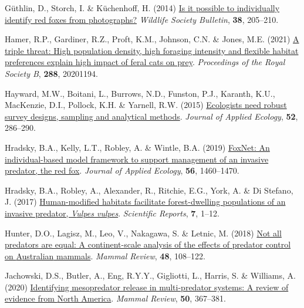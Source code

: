 \documentclass[preprint, 3p, authoryear]{elsarticle} %
\newlength{\cslhangindent}
\newlength{\cslentryspacingunit} %
\newenvironment{CSLReferences}[2] %
 {%
  \setlength{\parindent}{0pt}
  \ifodd #1
  \let\oldpar\par
  \def\par{\hangindent=\cslhangindent\oldpar}
  \fi
  \setlength{\parskip}{#2\cslentryspacingunit}
 }%
 {}
\begin{document}
\begin{CSLReferences}{1}{0}
\leavevmode{}%
Güthlin, D., Storch, I. \& Küchenhoff, H. (2014) \href{https://doi.org/10.1002/wsb.377}{Is it possible to individually identify red foxes from photographs?} \emph{Wildlife Society Bulletin}, \textbf{38}, 205--210.

\leavevmode{}%
Hamer, R.P., Gardiner, R.Z., Proft, K.M., Johnson, C.N. \& Jones, M.E. (2021) \href{https://doi.org/10.1098/rspb.2020.1194}{A triple threat: High population density, high foraging intensity and flexible habitat preferences explain high impact of feral cats on prey}. \emph{Proceedings of the Royal Society B}, \textbf{288}, 20201194.

\leavevmode{}%
Hayward, M.W., Boitani, L., Burrows, N.D., Funston, P.J., Karanth, K.U., MacKenzie, D.I., Pollock, K.H. \& Yarnell, R.W. (2015) \href{https://doi.org/10.1111/1365-2664.12408}{Ecologists need robust survey designs, sampling and analytical methods}. \emph{Journal of Applied Ecology}, \textbf{52}, 286--290.

\leavevmode{}%
Hradsky, B.A., Kelly, L.T., Robley, A. \& Wintle, B.A. (2019) \href{https://doi.org/10.1111/1365-2664.13374}{FoxNet: An individual-based model framework to support management of an invasive predator, the red fox}. \emph{Journal of Applied Ecology}, \textbf{56}, 1460--1470.

\leavevmode{}%
Hradsky, B.A., Robley, A., Alexander, R., Ritchie, E.G., York, A. \& Di Stefano, J. (2017) \href{https://doi.org/10.1038/s41598-017-12464-7}{Human-modified habitats facilitate forest-dwelling populations of an invasive predator, \emph{{V}ulpes vulpes}}. \emph{Scientific Reports}, \textbf{7}, 1--12.

\leavevmode{}%
Hunter, D.O., Lagisz, M., Leo, V., Nakagawa, S. \& Letnic, M. (2018) \href{https://doi.org/10.1111/mam.12115}{Not all predators are equal: A continent-scale analysis of the effects of predator control on {{A}ustralian} mammals}. \emph{Mammal Review}, \textbf{48}, 108--122.

\leavevmode{}%
Jachowski, D.S., Butler, A., Eng, R.Y.Y., Gigliotti, L., Harris, S. \& Williams, A. (2020) \href{https://doi.org/10.1111/mam.12207}{Identifying mesopredator release in multi-predator systems: A review of evidence from {North America}}. \emph{Mammal Review}, \textbf{50}, 367--381.


\end{CSLReferences}
\end{document}

